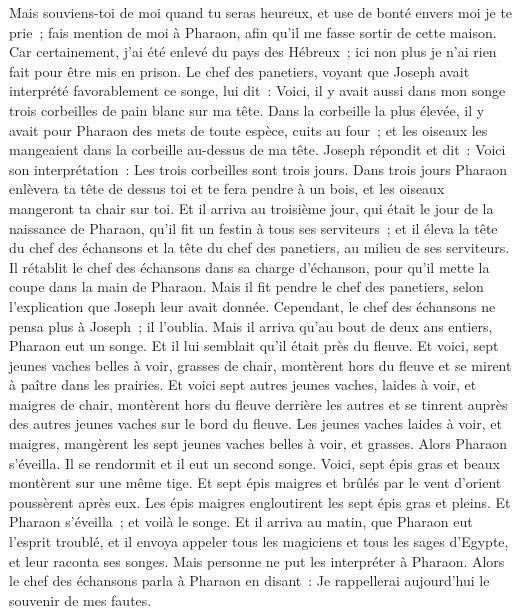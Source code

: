 \begin{multicols}{2}
Mais souviens-toi de moi quand tu seras heureux, et use de bonté envers moi je te prie~; fais mention de moi à Pharaon, afin qu'il me fasse sortir de cette maison.
Car certainement, j'ai été enlevé du pays des Hébreux~; ici non plus je n'ai rien fait pour être mis en prison.
Le chef des panetiers, voyant que Joseph avait interprété favorablement ce songe, lui dit~: Voici, il y avait aussi dans mon songe trois corbeilles de pain blanc sur ma tête.
Dans la corbeille la plus élevée, il y avait pour Pharaon des mets de toute espèce, cuits au four~; et les oiseaux les mangeaient dans la corbeille au-dessus de ma tête.
Joseph répondit et dit~: Voici son interprétation~: Les trois corbeilles sont trois jours.
Dans trois jours Pharaon enlèvera ta tête de dessus toi et te fera pendre à un bois, et les oiseaux mangeront ta chair sur toi.
Et il arriva au troisième jour, qui était le jour de la naissance de Pharaon, qu'il fit un festin à tous ses serviteurs~; et il éleva la tête du chef des échansons et la tête du chef des panetiers, au milieu de ses serviteurs.
Il rétablit le chef des échansons dans sa charge d'échanson, pour qu'il mette la coupe dans la main de Pharaon.
Mais il fit pendre le chef des panetiers, selon l'explication que Joseph leur avait donnée.
Cependant, le chef des échansons ne pensa plus à Joseph~; il l'oublia.
\VerseOne{}Mais il arriva qu'au bout de deux ans entiers, Pharaon eut un songe. Et il lui semblait qu'il était près du fleuve.
Et voici, sept jeunes vaches belles à voir, grasses de chair, montèrent hors du fleuve et se mirent à paître dans les prairies.
Et voici sept autres jeunes vaches, laides à voir, et maigres de chair, montèrent hors du fleuve derrière les autres et se tinrent auprès des autres jeunes vaches sur le bord du fleuve.
Les jeunes vaches laides à voir, et maigres, mangèrent les sept jeunes vaches belles à voir, et grasses. Alors Pharaon s'éveilla.
Il se rendormit et il eut un second songe. Voici, sept épis gras et beaux montèrent sur une même tige.
Et sept épis maigres et brûlés par le vent d'orient poussèrent après eux.
Les épis maigres engloutirent les sept épis gras et pleins. Et Pharaon s'éveilla~; et voilà le songe.
Et il arriva au matin, que Pharaon eut l'esprit troublé, et il envoya appeler tous les magiciens et tous les sages d'Egypte, et leur raconta ses songes. Mais personne ne put les interpréter à Pharaon.
Alors le chef des échansons parla à Pharaon en disant~: Je rappellerai aujourd'hui le souvenir de mes fautes.

\end{multicols}
